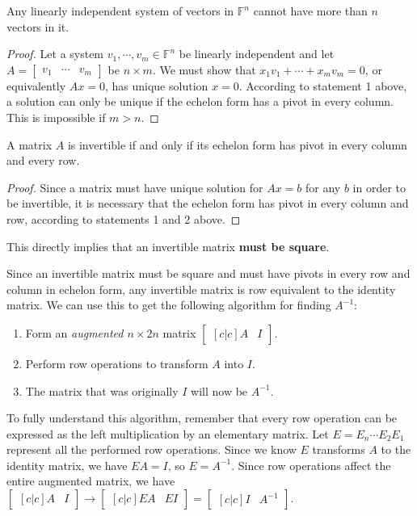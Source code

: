 \begin{theorem}
Any linearly independent system of vectors in $\mathbb{F}^{n}$ cannot have more than $n$ vectors in it. 
\end{theorem}

\begin{proof}
Let a system $v_{1}, \cdots, v_{m} \in \mathbb{F}^{n}$ be linearly independent and let $A = \begin{bmatrix}
v_{1} & \cdots & v_{m}
\end{bmatrix}$ be $n \times m$. We must show that $x_{1} v_{1} + \cdots + x_{m} v_{m}= 0$, or equivalently $Ax = 0$, has unique solution $x = 0$. According to statement 1 above, a solution can only be unique if the echelon form has a pivot in every column. This is impossible if $m > n$.  
\end{proof}

\begin{theorem}
A matrix $A$ is invertible if and only if its echelon form has pivot in every column and every row. 
\end{theorem}

\begin{proof}
Since a matrix must have unique solution for $Ax = b$ for any $b$ in order to be invertible, it is necessary that the echelon form has pivot in every column and row, according to statements 1 and 2 above. 
\end{proof}
This directly implies that an invertible matrix \textbf{must be square}.

Since an invertible matrix must be square and must have pivots in every row and column in echelon form, any invertible matrix is row equivalent to the identity matrix. We can use this to get the following algorithm for finding $A^{-1}$:

\begin{enumerate}
	\item Form an \textit{augmented $n \times 2n$} matrix 
	$\begin{bmatrix}[c|c] A & I\end{bmatrix}$.
	\item Perform row operations to transform $A$ into $I$.
	\item The matrix that was originally $I$ will now be $A^{-1}$.
\end{enumerate}

To fully understand this algorithm, remember that every row operation can be expressed as the left multiplication by an elementary matrix. Let $E = E_{n} \cdots E_{2} E_{1}$ represent all the performed row operations. Since we know $E$ transforms $A$ to the identity matrix, we have $EA = I$, so $E = A^{-1}$. Since row operations affect the entire augmented matrix, we have $\begin{bmatrix}[c|c]
A & I
\end{bmatrix} \rightarrow \begin{bmatrix}[c|c]
EA & EI
\end{bmatrix} = \begin{bmatrix}[c|c]
I & A^{-1}
\end{bmatrix}$. 

